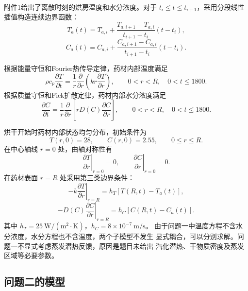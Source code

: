 \documentclass[12pt,a4paper]{article}
\begin{document}
附件1给出了离散时刻的烘房温度和水分浓度。对于
$t_i\le t\le t_{i+1}$，采用分段线性插值构造连续边界函数：
\begin{equation}
T_a(t)=T_{a,i}+\frac{T_{a,i+1}-T_{a,i}}{t_{i+1}-t_i}(t-t_i),
\end{equation}
\begin{equation}
C_a(t)=C_{a,i}+\frac{C_{a,i+1}-C_{a,i}}{t_{i+1}-t_i}(t-t_i).
\end{equation}

根据能量守恒和Fourier热传导定律，药材内部温度满足
\begin{equation}
\boxed{
\rho c_p\frac{\partial T}{\partial t}
=\frac{1}{r}\frac{\partial}{\partial r}
\left(kr\frac{\partial T}{\partial r}\right)},
\qquad 0<r<R,\quad 0<t\le1800.
\label{eq:merged-q1-heat}
\end{equation}
根据质量守恒和Fick扩散定律，药材内部水分浓度满足
\begin{equation}
\boxed{
\frac{\partial C}{\partial t}
=\frac{1}{r}\frac{\partial}{\partial r}
\left[rD(C)\frac{\partial C}{\partial r}\right]},
\qquad 0<r<R,\quad 0<t\le1800.
\label{eq:merged-q1-moisture}
\end{equation}

烘干开始时药材内部状态均匀分布，初始条件为
\begin{equation}
T(r,0)=28,\qquad C(r,0)=2.55,
\qquad 0\le r\le R.
\label{eq:merged-q1-initial}
\end{equation}
在中心轴线 $r=0$ 处，由轴对称性有
\begin{equation}
\left.\frac{\partial T}{\partial r}\right|_{r=0}=0,
\qquad
\left.\frac{\partial C}{\partial r}\right|_{r=0}=0.
\label{eq:merged-q1-center}
\end{equation}
在药材表面 $r=R$ 处采用第三类边界条件：
\begin{equation}
-k\left.\frac{\partial T}{\partial r}\right|_{r=R}
=h_T\left[T(R,t)-T_a(t)\right],
\label{eq:merged-q1-heat-bc}
\end{equation}
\begin{equation}
-D(C)\left.\frac{\partial C}{\partial r}\right|_{r=R}
=h_C\left[C(R,t)-C_a(t)\right].
\label{eq:merged-q1-moisture-bc}
\end{equation}
其中 $h_T=25\ \mathrm{W/(m^2\cdot K)}$，$h_C=8\times10^{-7}\ \mathrm{m/s}$。
由于问题一中温度方程不含水分浓度，水分方程也不含温度，两个子模型不发生
显式耦合，可以分别求解。问题一不显式考虑蒸发潜热反馈，原因是题目未给出
汽化潜热、干物质密度及蒸发区域等必要参数。

\subsection{问题二的模型}
\end{document}
